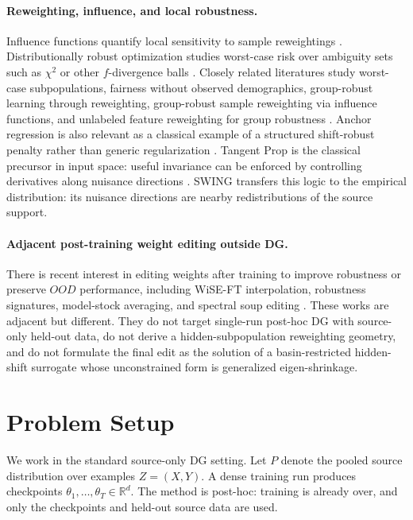 \documentclass{article}
\newcommand{\RR}{\mathbb{R}}
\newcommand{\swing}{\textup{\textsc{SWING}}}
\newcommand{\ood}{OOD}
\begin{document}
\paragraph{Reweighting, influence, and local robustness.}
Influence functions quantify local sensitivity to sample reweightings \citep{koh2017influence}. Distributionally robust optimization studies worst-case risk over ambiguity sets such as \(\chi^2\) or other \(f\)-divergence balls \citep{duchi2016fdiv,duchi2020variance,duchi2021learning}. Closely related literatures study worst-case subpopulations, fairness without observed demographics, group-robust learning through reweighting, group-robust sample reweighting via influence functions, and unlabeled feature reweighting for group robustness \citep{li2021worstcase,hashimoto2018fairness,lahoti2020fairness,sagawa2020groupdro,qiao2025gsr,qiu2023afr}. Anchor regression is also relevant as a classical example of a structured shift-robust penalty rather than generic regularization \citep{rothenhausler2021anchor}. Tangent Prop is the classical precursor in input space: useful invariance can be enforced by controlling derivatives along nuisance directions \citep{simard1991tangent}. \swing{} transfers this logic to the empirical distribution: its nuisance directions are nearby redistributions of the source support.

\paragraph{Adjacent post-training weight editing outside DG.}
There is recent interest in editing weights after training to improve robustness or preserve \(\ood{}\) performance, including WiSE-FT interpolation, robustness signatures, model-stock averaging, and spectral soup editing \citep{wortsman2021wiseft,cai2023rws,jang2024modelstock,abdollahpoorrostam2026monosoup}. These works are adjacent but different. They do not target single-run post-hoc DG with source-only held-out data, do not derive a hidden-subpopulation reweighting geometry, and do not formulate the final edit as the solution of a basin-restricted hidden-shift surrogate whose unconstrained form is generalized eigen-shrinkage.

\section{Problem Setup}
\label{sec:setup}

We work in the standard source-only DG setting. Let \(P\) denote the pooled source distribution over examples \(Z=(X,Y)\). A dense training run produces checkpoints \(\theta_1,\dots,\theta_T \in \RR^d\). The method is post-hoc: training is already over, and only the checkpoints and held-out source data are used.
\end{document}
